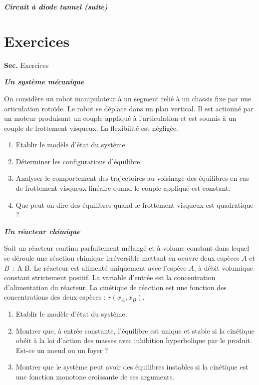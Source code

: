 \begin{exemple}{\bf \em Circuit {à} diode tunnel (suite)}
\newpage
\section{Exercices}
{{\bf Sec. \thesection}\hfill Exercices
\hspace*{5mm}}
 
\begin{exercice} {\bf \em Un système mécanique}

On considère un robot manipulateur à un segment relié à un
chassis  fixe par une articulation rotoïde. Le robot se déplace dans un
plan vertical. Il est actionné par un moteur produisant un couple
appliqué
à l'articulation et est soumis à un couple de frottement visqueux. La
flexibilité est négligée.
\begin{enumerate}
\item Etablir le modèle d'état du système.
\item Déterminer les configurations d'équilibre.
\item Analyser le comportement des trajectoires au voisinage des
équilibres en cas de frottement visqueux linéaire quand le couple
appliqué est constant.
\item Que peut-on dire des équilibres quand le frottement visqueux
est quadratique ?
\end{enumerate}
\end{exercice}
\vv

\begin{exercice}{\bf \em Un réacteur chimique}

Soit un réacteur continu parfaitement mélangé et à volume
constant dans lequel se déroule une réaction chimique 
irréversible mettant en oeuvre deux espèces $A$ et $B$~:
\eqnn
A \longrightarrow B.
\eeqnn
Le réacteur est alimenté uniquement avec l'espèce $A$, à
débit volumique constant strictement positif. La variable d'entrée est
la concentration d'alimentation du réacteur. La cinétique de réaction
est une fonction des concentrations des deux espèces : $r(x_A,x_B)$. 
\begin{enumerate}
\item Etablir le modèle d'état du système.
\item Montrer que, à entrée constante,  l'équilibre est unique et
stable si la cinétique obéit à la loi d'action des masses avec inhibition
hyperbolique par le produit.  Est-ce un noeud ou un foyer ?
\item Montrer que le système peut avoir des équilibres instables 
si la cinétique est une fonction monotone croissante de ses
arguments. 
\end{enumerate}
\end{exercice}
\vv


\end{exemple}
